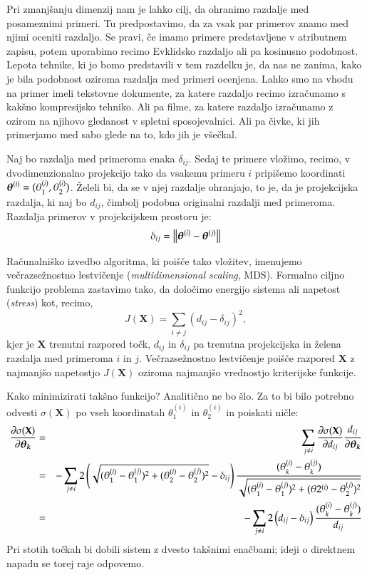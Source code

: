 Pri zmanjšanju dimenzij nam je lahko cilj, da ohranimo razdalje med posameznimi primeri. Tu predpostavimo, da za vsak par primerov znamo med njimi oceniti razdaljo. Se pravi, če imamo primere predstavljene v atributnem zapisu, potem uporabimo recimo Evklidsko razdaljo ali pa kosinusno podobnost. Lepota tehnike, ki jo bomo predstavili v tem razdelku je, da nas ne zanima, kako je bila podobnost oziroma razdalja med primeri ocenjena. Lahko smo na vhodu na primer imeli tekstovne dokumente, za katere razdaljo recimo izračunamo s kakšno kompresijsko tehniko. Ali pa filme, za katere razdaljo izračunamo z ozirom na njihovo gledanost v spletni sposojevalnici. Ali pa čivke, ki jih primerjamo med sabo glede na to, kdo jih je všečkal.

Naj bo razdalja med primeroma enaka $\delta_{ij}$. Sedaj te primere vložimo, recimo, v dvodimenzionalno projekcijo tako da vsakemu primeru $i$ pripišemo koordinati $\boldsymbol{\theta}^{(i)}=(\theta_1^{(i)},\theta_2^{(i)})$. Želeli bi, da se v njej razdalje ohranjajo, to je, da je projekcijska razdalja, ki naj bo $d_{ij}$, čimbolj podobna originalni razdalji med primeroma. Razdalja primerov v projekcijskem prostoru je:
$$\delta_{ij}=\left\lVert{\boldsymbol{\theta}}^{(i)}-\boldsymbol{\theta}^{(j)}\right\rVert$$

Računalniško izvedbo algoritma, ki poišče tako vložitev, imenujemo večrazsežnostno lestvičenje ({\em multidimensional scaling}, MDS). Formalno ciljno funkcijo problema zastavimo tako, da določimo energijo sistema ali napetost ({\em stress}) kot, recimo,
$$J(\mathbf{X}) = \sum_{i\ne j} (d_{ij} - \delta_{ij})^2,$$
kjer je $\mathbf{X}$ trenutni razpored točk, $d_{ij}$ in $\delta_{ij}$ pa trenutna projekcijska in želena razdalja med primeroma $i$ in $j$. Večrazsežnostno lestvičenje poišče razpored $\mathbf{X}$ z najmanjšo napetostjo $J(\mathbf{X})$ oziroma najmanjšo vrednostjo kriterijske funkcije.

Kako minimizirati takšno funkcijo? Analitično ne bo šlo. Za to bi bilo potrebno odvesti $\sigma(\mathbf{X})$ po vseh koordinatah $\theta_1^{(i)}$ in $\theta_2^{(i)}$ in poiskati ničle:
\begin{eqnarray}
  \frac{\partial\sigma({\mathbf{X}})}{\partial \boldsymbol{\theta_k}} & = &
  \sum_{j\ne i} \frac{\partial\sigma({\mathbf{X}})}{\partial d_{ij}}\frac{d_{ij}}{\partial \boldsymbol{\theta_k}} \nonumber \\
  & = & - \sum_{j\ne i} 2\left(\sqrt{(\theta_1^{(i)}-\theta_1^{(j)})^2+(\theta_2^{(i)}-\theta_2^{(j)})^2}-\delta_{ij}\right) \frac{(\theta_k^{(i)}-\theta_k^{(j)})}{\sqrt{(\theta_1^{(i)}-\theta_1^{(j)})^2+(\theta2^{(i)}-\theta_2^{(j)})^2}} \nonumber \\
& = & - \sum_{j\ne i} 2\left(d_{ij}-\delta_{ij}\right) \frac{(\theta_k^{(i)}-\theta_k^{(j)})}{d_{ij}} \label{eq:mds-grad}
\end{eqnarray}
Pri stotih točkah bi dobili sistem z dvesto takšnimi enačbami; ideji o direktnem napadu se torej raje odpovemo.

